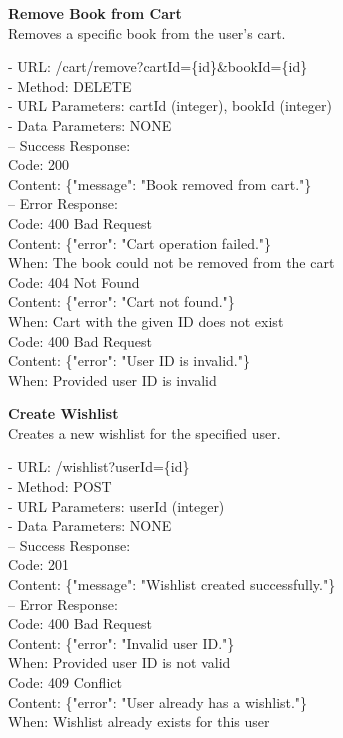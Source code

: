 \begin{flushleft}
    \textbf{Remove Book from Cart} \\
    Removes a specific book from the user's cart.

    - URL: /cart/remove?cartId=\{id\}\&bookId=\{id\} \\
    - Method: DELETE \\
    - URL Parameters: cartId (integer), bookId (integer) \\
    - Data Parameters: NONE \\
    – Success Response: \\
    Code: 200 \\
    Content: \{"message": "Book removed from cart."\} \\
    – Error Response: \\
    Code: 400 Bad Request \\
    Content: \{"error": "Cart operation failed."\} \\
    When: The book could not be removed from the cart \\
    Code: 404 Not Found \\
    Content: \{"error": "Cart not found."\} \\
    When: Cart with the given ID does not exist \\
    Code: 400 Bad Request \\
    Content: \{"error": "User ID is invalid."\} \\
    When: Provided user ID is invalid
\end{flushleft}

\begin{flushleft}
    \textbf{Create Wishlist} \\
    Creates a new wishlist for the specified user.

    - URL: /wishlist?userId=\{id\} \\
    - Method: POST \\
    - URL Parameters: userId (integer) \\
    - Data Parameters: NONE \\
    – Success Response: \\
    Code: 201 \\
    Content: \{"message": "Wishlist created successfully."\} \\
    – Error Response: \\
    Code: 400 Bad Request \\
    Content: \{"error": "Invalid user ID."\} \\
    When: Provided user ID is not valid \\
    Code: 409 Conflict \\
    Content: \{"error": "User already has a wishlist."\} \\
    When: Wishlist already exists for this user
\end{flushleft}

